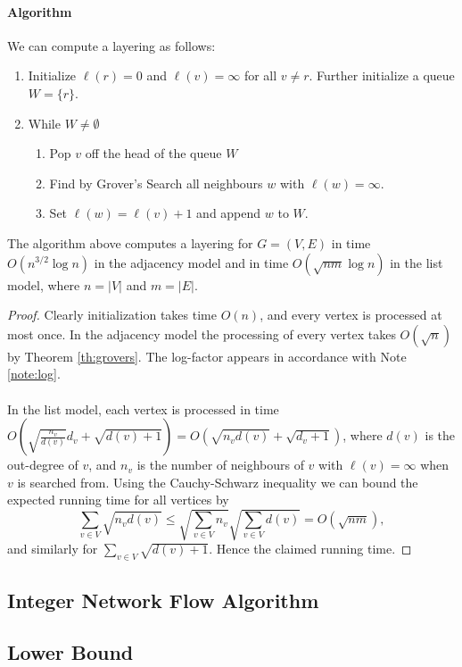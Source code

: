 \paragraph{Algorithm}
We can compute a layering as follows:
\begin{enumerate}
\item Initialize $\ell(r) = 0$ and $\ell(v) = \infty$ for all $v \neq r$. Further initialize a queue $W = \{r\}$.
\item While $W\neq \emptyset$
	\begin{enumerate}
	\item Pop $v$ off the head of the queue $W$
	\item Find by Grover's Search all neighbours $w$ with $\ell(w) = \infty$.
	\item Set $\ell(w) = \ell(v) + 1$ and append $w$ to $W$.
	\end{enumerate} 
\end{enumerate}
\begin{theorem}\label{th:layering}
The algorithm above computes a layering for $G=(V,E)$  in time $O(n^{3/2}\log n)$ in the adjacency model and in time $O(\sqrt{nm}\log n)$ in the list model, where $n = |V|$ and $m = |E|$.
\end{theorem}
\begin{proof}
Clearly initialization takes time $O(n)$, and every vertex is processed at most once. In the adjacency model the processing of every vertex takes $O(\sqrt{n})$ by Theorem \ref{th:grovers}. The log-factor appears in accordance with Note \ref{note:log}.
\paragraph{}
In the list model, each vertex is processed in time $O(\sqrt{\frac{n_v}{d(v)}}d_v + \sqrt{d(v) + 1}) = O(\sqrt{n_vd(v)} + \sqrt{d_v + 1})$, where $d(v)$ is the out-degree of $v$, and $n_v$ is the number of neighbours of $v$ with $\ell(v)=\infty$ when $v$ is searched from. Using the Cauchy-Schwarz inequality we can bound the expected running time for all vertices by
$$\sum_{v\in V} \sqrt{n_vd(v)} \leq \sqrt{\sum_{v\in V} n_v}\sqrt{\sum_{v \in V} d(v)} = O(\sqrt{nm}),$$
and similarly for $\sum_{v \in V} \sqrt{d(v) + 1}$. Hence the claimed running time.
\end{proof}
\subsection{Integer Network Flow Algorithm}

\subsection{Lower Bound}